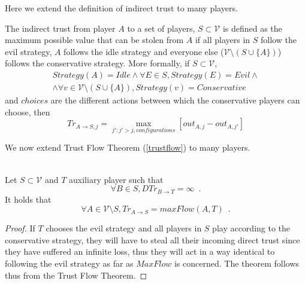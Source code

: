 \documentclass[11pt]{llncs}
\theoremstyle{definition}
\begin{document}
     Here we extend the definition of indirect trust to many players.
     \begin{definition}
        The indirect trust from player $A$ to a set of players, $S \subset \mathcal{V}$ is defined as the maximum possible
        value that can be stolen from $A$ if all players in $S$ follow the evil strategy, $A$ follows the idle strategy and
        everyone else ($\mathcal{V} \setminus \left(S \cup \{A\}\right)$) follows the conservative strategy. More formally,
        if $S \subset \mathcal{V}$,
        \begin{equation}
        \begin{gathered}
           Strategy\left(A\right) = Idle \wedge \forall E \in S, Strategy\left(E\right) = Evil \wedge \\
           \wedge \forall v \in \mathcal{V} \setminus \left(S \cup \{A\}\right), Strategy\left(v\right) = Conservative
        \end{gathered}
        \end{equation}
        and $choices$ are the different actions between which the conservative players can choose, then
        \begin{equation}
           Tr_{A \rightarrow S, j} = \max\limits_{j' : j' > j, configurations}{\left[out_{A,j} - out_{A,j'}\right]}
        \end{equation}
     \end{definition}
     We now extend Trust Flow Theorem (\ref{trustflow}) to many players.
     \begin{theorem} \ \\
        \label{trustmany}
        Let $S \subset \mathcal{V}$ and $T$ auxiliary player such that
        \begin{equation}
           \forall B \in S, DTr_{B \rightarrow T} = \infty \enspace.
        \end{equation}
        It holds that
        \begin{equation}
           \forall A \in \mathcal{V} \setminus S, Tr_{A \rightarrow S} = maxFlow\left(A, T\right) \enspace.
        \end{equation}
     \end{theorem}       
     \begin{proof}
        If $T$ chooses the evil strategy and all players in $S$ play according to the conservative strategy, they will have
        to steal all their incoming direct trust since they have suffered an infinite loss, thus they will act in a way
        identical to following the evil strategy as far as $MaxFlow$ is concerned. The theorem follows thus from the Trust
        Flow Theorem.
     \end{proof}
\end{document}
